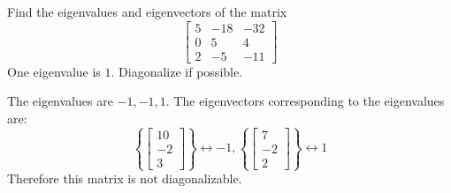 \documentclass{ximera}
\begin{document}
\begin{problem}\label{prb:8.20} Find the eigenvalues and eigenvectors of the matrix
\begin{equation*}
\left[
\begin{array}{rrr}
5 & -18 & -32 \\
0 & 5 & 4 \\
2 & -5 & -11
\end{array}
\right]
\end{equation*}
One eigenvalue is $1.$ Diagonalize if possible.
\begin{hint}
The eigenvalues are $-1, -1, 1$. The eigenvectors corresponding to the eigenvalues are:
\[
\left\{ \left[
\begin{array}{c}
10 \\
-2 \\
3
\end{array}
\right] \right\} \leftrightarrow -1,  \left\{ \left[
\begin{array}{c}
7 \\
-2 \\
2
\end{array}
\right] \right\} \leftrightarrow 1
\]
Therefore this matrix is not diagonalizable.
\end{hint}
\end{problem}
\end{document}
